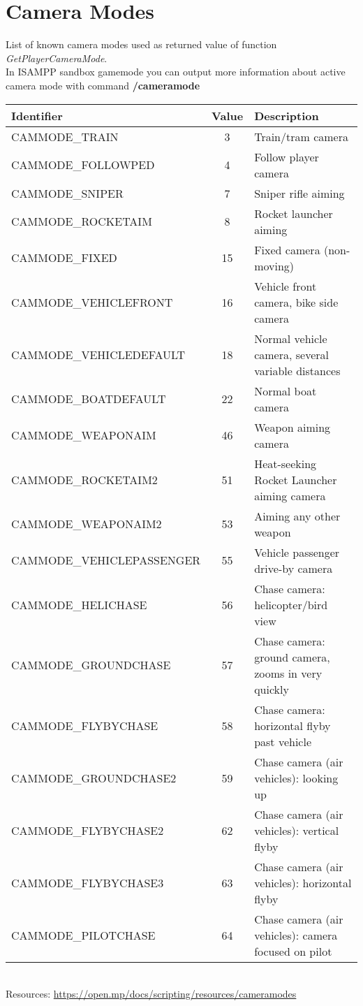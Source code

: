 \documentclass{article}
\begin{document}
\newpage
\section{Camera Modes}
\begin{sloppypar}
List of known camera modes used as returned value of function \textit{GetPlayerCameraMode}.\\In ISAMPP sandbox gamemode you can output more information about active camera mode with command \textbf{/cameramode}
\end{sloppypar}
\bigskip
\noindent\begin{tabular}{ |l|c|l| } 
\hline
Identifier & Value & Description \\
\hline
CAMMODE\_TRAIN & 3 & Train/tram camera \\
CAMMODE\_FOLLOWPED & 4 & Follow player camera \\
CAMMODE\_SNIPER & 7 & Sniper rifle aiming \\
CAMMODE\_ROCKETAIM & 8 & Rocket launcher aiming \\
CAMMODE\_FIXED & 15 & Fixed camera (non-moving) \\
CAMMODE\_VEHICLEFRONT & 16 & Vehicle front camera, bike side camera \\
CAMMODE\_VEHICLEDEFAULT & 18 & Normal vehicle camera, several variable distances \\
CAMMODE\_BOATDEFAULT & 22 & Normal boat camera \\
CAMMODE\_WEAPONAIM & 46 & Weapon aiming camera \\
CAMMODE\_ROCKETAIM2 & 51 & Heat-seeking Rocket Launcher aiming camera \\
CAMMODE\_WEAPONAIM2 & 53 & Aiming any other weapon \\
CAMMODE\_VEHICLEPASSENGER & 55 & Vehicle passenger drive-by camera \\
CAMMODE\_HELICHASE & 56 & Chase camera: helicopter/bird view \\
CAMMODE\_GROUNDCHASE & 57 & Chase camera: ground camera, zooms in very quickly \\
CAMMODE\_FLYBYCHASE & 58 & Chase camera: horizontal flyby past vehicle \\
CAMMODE\_GROUNDCHASE2 & 59 & Chase camera (air vehicles): looking up \\
CAMMODE\_FLYBYCHASE2 & 62 & Chase camera (air vehicles): vertical flyby \\
CAMMODE\_FLYBYCHASE3 & 63 & Chase camera (air vehicles): horizontal flyby \\
CAMMODE\_PILOTCHASE & 64 & Chase camera (air vehicles): camera focused on pilot \\
\hline
\end{tabular}
\bigskip
\\Resources: \url{https://open.mp/docs/scripting/resources/cameramodes}
\end{document}
